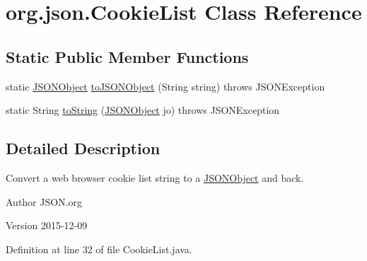 \hypertarget{classorg_1_1json_1_1CookieList}{\section{org.\-json.\-Cookie\-List Class Reference}
\label{classorg_1_1json_1_1CookieList}
}
\subsection*{Static Public Member Functions}
\begin{DoxyCompactItemize}
\item 
static \hyperlink{classorg_1_1json_1_1JSONObject}{J\-S\-O\-N\-Object} \hyperlink{classorg_1_1json_1_1CookieList_a3f79cd0dadd831ff9bdfb6afd41cd081}{to\-J\-S\-O\-N\-Object} (String string)  throws J\-S\-O\-N\-Exception 
\item 
static String \hyperlink{classorg_1_1json_1_1CookieList_a40f938404f28eda8b66bc17dfcd2261f}{to\-String} (\hyperlink{classorg_1_1json_1_1JSONObject}{J\-S\-O\-N\-Object} jo)  throws J\-S\-O\-N\-Exception 
\end{DoxyCompactItemize}


\subsection{Detailed Description}
Convert a web browser cookie list string to a \hyperlink{classorg_1_1json_1_1JSONObject}{J\-S\-O\-N\-Object} and back. \begin{DoxyAuthor}{Author}
J\-S\-O\-N.\-org 
\end{DoxyAuthor}
\begin{DoxyVersion}{Version}
2015-\/12-\/09 
\end{DoxyVersion}


Definition at line 32 of file Cookie\-List.\-java.



